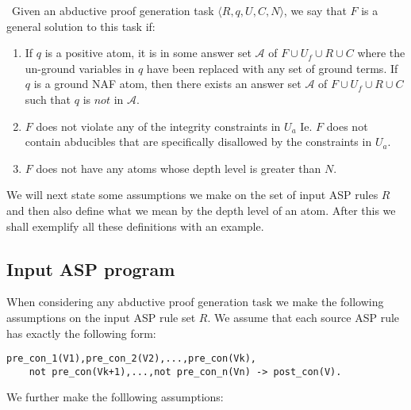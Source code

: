 \begin{definition}\label{def:abductive_proof_generation_solution} \
Given an abductive proof generation task $\langle R,q,U,C,N \rangle$, we say that $F$ is a general solution to this task if:
\begin{enumerate}
    \item If $q$ is a positive atom, it is in some answer set $\mathcal{A}$ of $F\cup U_{f}\cup R\cup C$ where the un-ground variables in $q$ have been replaced with any set of ground terms. If $q$ is a ground NAF atom, then there exists an answer set $\mathcal{A}$ of $F\cup U_{f}\cup R\cup C$ such that $q$ is $not$ in $\mathcal{A}$.
    \item $F$ does not violate any of the integrity constraints in $U_{a}$ Ie. $F$ does not contain abducibles that are specifically disallowed by the constraints in $U_{a}$.
    \item $F$ does not have any atoms whose depth level is greater than $N$.
\end{enumerate}
\end{definition} We will next state some assumptions we make on the set of input ASP rules $R$ and then also define what we mean by the depth level of an atom. After this we shall exemplify all these definitions with an example. 
\subsection{Input ASP program}
When considering any abductive proof generation task we make the following assumptions on the input ASP rule set $R$. We assume that each source ASP rule has exactly the following form:
\begin{lstlisting}[frame=none]
pre_con_1(V1),pre_con_2(V2),...,pre_con(Vk),
    not pre_con(Vk+1),...,not pre_con_n(Vn) -> post_con(V).
\end{lstlisting}
We further make the folllowing assumptions:

